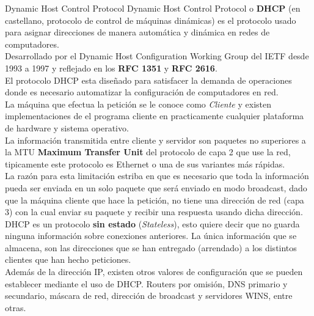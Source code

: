 \begin{frame}{Dynamic Host Control Protocol} %
    Dynamic Host Control Protocol o \textbf{DHCP} (en castellano, protocolo de
    control de máquinas dinámicas) es el protocolo usado para asignar
    direcciones de manera automática y dinámica en redes de computadores. \\[0.2cm]

    Desarrollado por el Dynamic Host Configuration Working Group del IETF desde
    1993 a 1997 y reflejado en los \textbf{RFC 1351} y \textbf{RFC 2616}. \\[0.2cm]

    El protocolo DHCP esta diseñado para satisfacer la demanda de operaciones
    donde es necesario automatizar la configuración de computadores en red. \\[0.2cm]

    La máquina que efectua la petición se le conoce como \textit{Cliente} y
    existen implementaciones de el programa cliente en practicamente cualquier
    plataforma de hardware y sistema operativo. \\[0.2cm]

    La información transmitida entre cliente y servidor son paquetes no
    superiores a la MTU \textbf{Maximum Transfer Unit} del protocolo de capa 2
    que use la red, tipicamente este protocolo es Ethernet o una de
    sus variantes más rápidas. \\[0.2cm]

    La razón para esta limitación estriba en que es necesario que toda la
    información pueda ser enviada en un solo paquete que será enviado en
    modo broadcast, dado que la máquina cliente que hace la petición, no tiene
    una dirección de red (capa 3) con la cual enviar su paquete y recibir una
    respuesta usando dicha dirección. \\[0.2cm]

    DHCP es un protocolo \textbf{sin estado} (\textit{Stateless}), esto quiere
    decir que no guarda ninguna información sobre conexiones anteriores. La
    única información que se almacena, son las direcciones que se han entregado
    (arrendado) a los distintos clientes que han hecho peticiones.\\[0.2cm]

    Además de la dirección IP, existen otros valores de configuración que se
    pueden establecer mediante el uso de DHCP. Routers por omisión, DNS
    primario y secundario, máscara de red, dirección de broadcast y servidores
    WINS, entre otras.\\[0.2cm]

\end{frame} 

